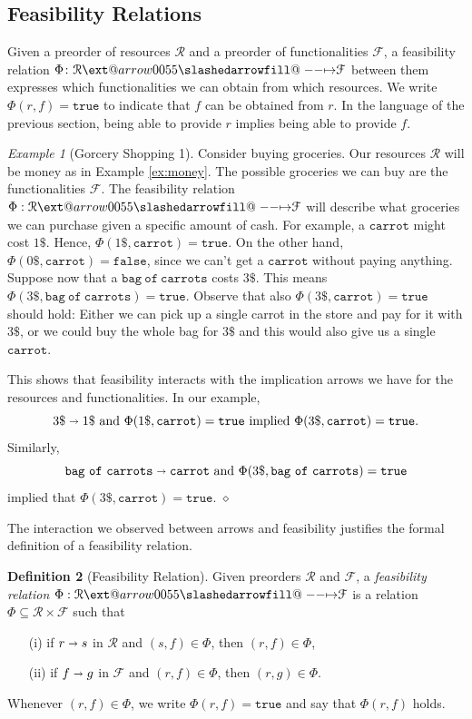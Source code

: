 \documentclass[12pt]{article}
\makeatletter
\theoremstyle{definition}
\newtheorem{definition}{Definition}[section]
\theoremstyle{plain}
\theoremstyle{plain}
\theoremstyle{plain}
\theoremstyle{plain}
\theoremstyle{remark}
\newtheorem{example}[definition]{Example}
\newcommand\xqed[1]{%
	\leavevmode\unskip\penalty9999 \hbox{}\nobreak\hfill
	\quad\hbox{#1}}
\newcommand\exampleend{\xqed{$\diamond$}}
\theoremstyle{remark}
\newcommand{\mc}[1]{\mathcal{#1}}
\newcommand{\sub}{\subseteq}
\newcommand{\true}{\mathtt{true}}
\def\slashedarrowfill@#1#2#3#4#5{%
	$\m@th\thickmuskip0mu\medmuskip\thickmuskip\thinmuskip\thickmuskip
	\relax#5#1\mkern-7mu%
	\cleaders\hbox{$#5\mkern-2mu#2\mkern-2mu$}\hfill
	\mathclap{#3}\mathclap{#2}%
	\cleaders\hbox{$#5\mkern-2mu#2\mkern-2mu$}\hfill
	\mkern-7mu#4$%
}
\def\rightslashedarrowfill@{%
	\slashedarrowfill@\relbar\relbar\mapstochar\rightarrow}
\newcommand\xslashedrightarrow[2][]{%
	\ext@arrow 0055{\rightslashedarrowfill@}{#1}{#2}}
\makeatother
\begin{document}
\subsection{Feasibility Relations}
Given a preorder of resources $\mc{R}$ and a preorder of functionalities $\mc{F}$, a feasibility relation $\Phi \colon \mc{R} \xslashedrightarrow{} \mc{F}$ between them expresses which functionalities we can obtain from which resources. We write $\Phi(r,f) = \mathtt{true}$ to indicate that $f$ can be obtained from $r$. In the language of the previous section, being able to provide $r$ implies being able to provide $f$.

\begin{example}[Gorcery Shopping 1]\label{ex:groceries}
	Consider buying groceries. Our resources $\mc{R}$ will be money as in Example \ref{ex:money}. The possible groceries we can buy are the functionalities $\mc{F}$. The feasibility relation $\Phi: \mc{R} \xslashedrightarrow{} \mc{F}$ will describe what groceries we can purchase given a specific amount of cash. For example, a $\mathtt{carrot}$ might cost $1\$$. Hence, $\Phi(1\$,\mathtt{carrot}) = \mathtt{true}$. On the other hand, $\Phi(0\$, \mathtt{carrot}) = \mathtt{false}$, since we can't get a $\mathtt{carrot}$ without paying anything. Suppose now that a $\mathtt{bag\ of\ carrots}$ costs $3\$$. This means $\Phi(3\$,\mathtt{bag\ of\ carrots}) = \mathtt{true}$. Observe that also $\Phi(3\$,\mathtt{carrot}) = \true$ should hold: Either we can pick up a single carrot in the store and pay for it with $3\$$, or we could buy the whole bag for $3\$$ and this would also give us a single $\mathtt{carrot}$. 
	
	This shows that feasibility interacts with the implication arrows we have for the resources and functionalities. In our example,
	$$3\$ \shortrightarrow 1\$ \text{ and } \Phi(1\$, \mathtt{carrot}) = \true  \text{ implied } \Phi(3\$, \mathtt{carrot}) = \true.$$ 
	Similarly, 
	$$\mathtt{bag\ of\ carrots} \shortrightarrow \mathtt{carrot}  \text{ and } \Phi(3\$,\mathtt{bag\ of\ carrots}) = \mathtt{true} $$ 
	implied that $\Phi(3\$,\mathtt{carrot}) = \true.$ \exampleend
\end{example}

The interaction we observed between arrows and feasibility justifies the formal definition of a feasibility relation.

\begin{definition}[Feasibility Relation]\label{def:feasibility}
	Given preorders $\mc{R}$ and $\mc{F}$, a \emph{feasibility relation} $\Phi: \mc{R} \xslashedrightarrow{} \mc{F}$ is a relation $\Phi \sub \mc{R} \times \mc{F}$ such that
	\begin{itemize}
		\item[(i)] if $r \shortrightarrow s$ in $\mc{R}$ and $(s,f) \in \Phi$, then $(r,f) \in \Phi$,
		\item[(ii)] if $f \shortrightarrow g$ in $\mc{F}$ and $(r,f) \in \Phi$, then $(r,g) \in \Phi$.
	\end{itemize}
	Whenever $(r,f) \in \Phi$, we write $\Phi(r,f) = \true$ and say that $\Phi(r,f)$ holds.
\end{definition}
\end{document}
